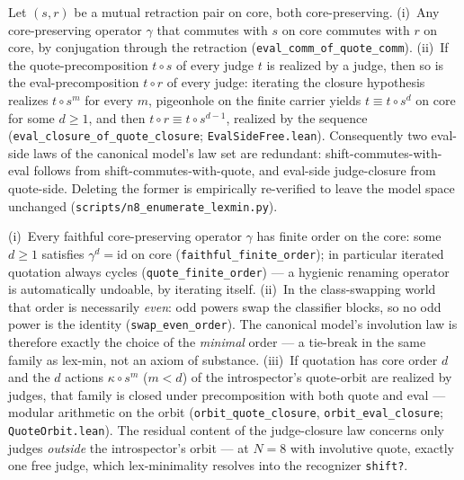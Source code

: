 \documentclass[sigconf,screen]{acmart}
\theoremstyle{remark}
\begin{document}
\begin{theorem}
\label{thm:eval-side-free}
Let $(s, r)$ be a mutual retraction pair on core, both core-preserving.
(i)~Any core-preserving operator $\gamma$ that commutes with $s$ on
core commutes with $r$ on core, by conjugation through the retraction
(\texttt{eval\_comm\_of\_quote\_comm}). (ii)~If the
quote-precomposition $t \circ s$ of every judge $t$ is realized by a
judge, then so is the eval-precomposition $t \circ r$ of every judge:
iterating the closure hypothesis realizes $t \circ s^m$ for every $m$,
pigeonhole on the finite carrier yields $t \equiv t \circ s^d$ on core
for some $d \geq 1$, and then $t \circ r \equiv t \circ s^{d-1}$,
realized by the sequence (\texttt{eval\_closure\_of\_quote\_closure};
\texttt{EvalSideFree.lean}). Consequently two eval-side laws of the
canonical model's law set are redundant: shift-commutes-with-eval
follows from shift-commutes-with-quote, and eval-side judge-closure
from quote-side. Deleting the former is empirically re-verified to
leave the model space unchanged
(\texttt{scripts/n8\_enumerate\_lexmin.py}).
\end{theorem}

\begin{theorem}
\label{thm:orbit}
(i)~Every faithful core-preserving operator $\gamma$ has finite order
on the core: some $d \geq 1$ satisfies $\gamma^d = \mathrm{id}$ on
core (\texttt{faithful\_finite\_order}); in particular iterated
quotation always cycles (\texttt{quote\_finite\_order}) --- a hygienic
renaming operator is automatically undoable, by iterating itself.
(ii)~In the class-swapping world that order is necessarily \emph{even}:
odd powers swap the classifier blocks, so no odd power is the identity
(\texttt{swap\_even\_order}). The canonical model's involution law is
therefore exactly the choice of the \emph{minimal} order --- a
tie-break in the same family as lex-min, not an axiom of substance.
(iii)~If quotation has core order $d$ and the $d$ actions
$\kappa \circ s^m$ ($m < d$) of the introspector's quote-orbit are
realized by judges, that family is closed under precomposition with
both quote and eval --- modular arithmetic on the orbit
(\texttt{orbit\_quote\_closure}, \texttt{orbit\_eval\_closure};
\texttt{QuoteOrbit.lean}). The residual content of the judge-closure
law concerns only judges \emph{outside} the introspector's orbit ---
at $N\!=\!8$ with involutive quote, exactly one free judge, which
lex-minimality resolves into the recognizer \texttt{shift?}.
\end{theorem}
\end{document}
